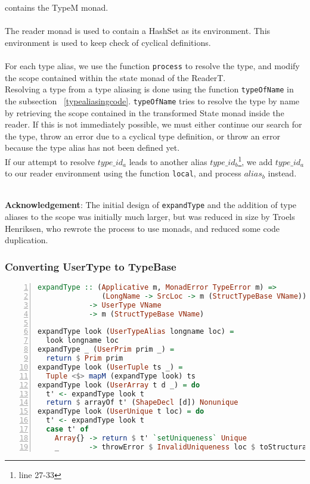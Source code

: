 contains the TypeM monad.
\\
\\
\noindent
The reader monad is used to contain a HashSet as its environment. This
environment is used to keep check of cyclical definitions.
\\
\\
For each type alias, we use the function \texttt{process} to resolve the type, and modify
the scope contained within the state monad of the ReaderT.
\\
Resolving a type from a type aliasing is done using the function \texttt{typeOfName} in
the subsection ~\ref{typealiasingcode}. \texttt{typeOfName} tries to
resolve the type by name by retrieving the scope contained in the transformed
State monad inside the reader.
\clearpage
\noindent
If this is not immediately possible, we must either continue our search for the type, throw an error due to a cyclical type definition, or throw an error because the type alias has not been defined yet.
\\
If our attempt to resolve $type\_id_a$ leads to another alias
$type\_id_b$\footnote{line 27-33}, we add
$type\_id_a$ to our reader environment using the function \texttt{local}, and
process $alias_b$ instead.
\\
\\
\begin{tcolorbox}
\textbf{Acknowledgement}: The initial design of \texttt{expandType} and the addition of
type aliases to the scope was initially much larger, but was reduced in size by
Troels Henriksen, who rewrote the process to use monads, and reduced some code
duplication. 
\end{tcolorbox}
\subsubsection{Converting UserType to TypeBase}
\begin{lstlisting}[language=Haskell, numbers=left]
expandType :: (Applicative m, MonadError TypeError m) =>
               (LongName -> SrcLoc -> m (StructTypeBase VName))
            -> UserType VName
            -> m (StructTypeBase VName)

expandType look (UserTypeAlias longname loc) =
  look longname loc
expandType _ (UserPrim prim _) =
  return $ Prim prim
expandType look (UserTuple ts _) =
  Tuple <$> mapM (expandType look) ts
expandType look (UserArray t d _) = do
  t' <- expandType look t
  return $ arrayOf t' (ShapeDecl [d]) Nonunique
expandType look (UserUnique t loc) = do
  t' <- expandType look t
  case t' of
    Array{} -> return $ t' `setUniqueness` Unique
    _       -> throwError $ InvalidUniqueness loc $ toStructural t'

\end{lstlisting}

